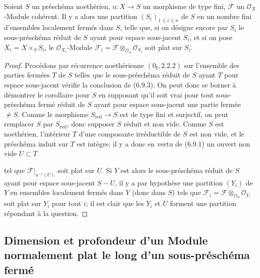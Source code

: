 \begin{corollary}[6.9.3]
\label{IV.2.s6.9.3-fr}
Soient $S$ un préschéma noethérien, $u:X\to S$ un morphisme de type fini,
$\mathcal F$ un $\mathcal O_X$-Module cohérent. Il y a alors une partition
$(S_i)_{1\leq i\leq n}$ de $S$ en un nombre fini d'ensembles localement fermés
dans $S$, telle que, si on désigne encore par $S_i$ le sous-préschéma réduit
de $S$ ayant pour espace sous-jacent $S_i$, et si on pose
$X_i=X\times_S S_i$, le $\mathcal O_{X_i}$-Module
$\mathcal F_i=\mathcal F\otimes_{\mathcal O_S}\mathcal O_{S_i}$ soit plat
sur $S_i$.
\end{corollary}

\begin{proof}
Procédons par récurrence noethérienne $(0_{\mathrm I},2.2.2)$ sur l'ensemble
des parties fermées $T$ de $S$ telles que le sous-préschéma réduit de $S$
ayant $T$ pour espace sous-jacent vérifie la conclusion de (6.9.3). On peut
donc se borner à démontrer le corollaire pour $S$ en supposant qu'il soit vrai
pour tout sous-préschéma fermé réduit de $S$ ayant pour espace sous-jacent une
partie fermée $\ne S$. Comme le morphisme $S_{\mathrm{red}}\to S$ est de type
fini et surjectif, on peut remplacer $S$ par $S_{\mathrm{red}}$, donc supposer
$S$ réduit et non vide. Comme $S$ est noethérien, l'intérieur $T$ d'une
composante irréductible de $S$ est non vide, et le préschéma induit sur $T$
est intègre; il y a donc en vertu de (6.9.1) un ouvert non vide $U\subset T$


tel que $\mathcal F|_{u^{-1}(U)}$ soit plat sur $U$. Si $Y$ est alors le
sous-préschéma réduit de $S$ ayant pour espace sous-jacent $S-U$, il y a par
hypothèse une partition $(Y_i)$ de $Y$ en ensembles localement fermés dans
$Y$ (donc dans $S$) tels que
$\mathcal F_i=\mathcal F\otimes_{\mathcal O_S}\mathcal O_{Y_i}$ soit plat
sur $Y_i$ pour tout $i$; il est clair que les $Y_i$ et $U$ forment une
partition répondant à la question.
\end{proof}

\subsection{Dimension et profondeur d'un Module normalement plat le long d'un
sous-préschéma fermé}
\label{subsection:IV.6.10}

